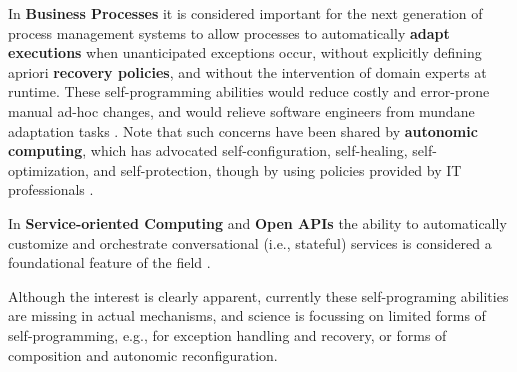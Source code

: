 In \textbf{Business Processes} it is considered important for the next generation
of process management systems to allow processes to automatically
\textbf{adapt executions} when unanticipated exceptions occur, without
explicitly defining apriori \textbf{recovery policies}, and without the
intervention of domain experts at runtime. These self-programming
abilities would reduce costly and error-prone manual ad-hoc changes, and would relieve
software engineers from mundane adaptation
tasks \autocite[]{MarrellaMS17}.  
Note that such concerns have been shared by
\textbf{autonomic computing}, which has advocated self-configuration, self-healing, self-optimization, and self-protection, though by using policies provided by
IT professionals \autocite[]{ibm2005autonomic}.


In \textbf{Service-oriented Computing} and \textbf{Open APIs} the
ability to  automatically customize and orchestrate conversational
(i.e., stateful) services is considered a foundational feature of the
field \autocite[]{wsf2014}.








Although the interest is clearly apparent, currently these
self-programing abilities are missing in actual mechanisms, and
science is focussing on limited forms  of self-programming, e.g., for
exception handling and recovery, or forms of composition and 
autonomic reconfiguration.

